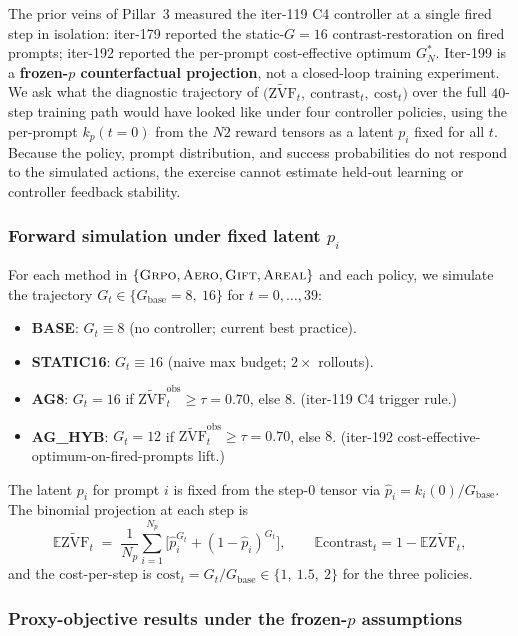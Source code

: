 \documentclass{article}
\newcommand{\grpo}{\textsc{Grpo}}
\newcommand{\E}{\mathbb{E}}
\newcommand{\zvf}{\ensuremath{\widetilde{\mathrm{ZVF}}}}
\begin{document}
The prior veins of Pillar~3 measured the iter-119 C4 controller at a single
fired step in isolation: iter-179 reported the static-$G=16$ contrast-restoration
on fired prompts; iter-192 reported the per-prompt cost-effective optimum
$G_N^*$. Iter-199 is a \textbf{frozen-$p$ counterfactual projection}, not a
closed-loop training experiment. We ask what the diagnostic trajectory of
$\bigl(\zvf_t,\ \mathrm{contrast}_t,\ \mathrm{cost}_t\bigr)$ over the full
$40$-step training path would have looked like under four controller policies,
using the per-prompt $k_p(t=0)$ from the $N2$ reward tensors as a latent
$p_i$ fixed for all $t$. Because the policy, prompt distribution, and success
probabilities do not respond to the simulated actions, the exercise cannot
estimate held-out learning or controller feedback stability.

\subsubsection*{Forward simulation under fixed latent $p_i$}

For each method in $\{\grpo,\textsc{Aero},\textsc{Gift},\textsc{Areal}\}$ and
each policy, we simulate the trajectory $G_t \in \{G_{\text{base}}=8,\ 16\}$
for $t=0,\dots,39$:
\begin{itemize}
\item \textbf{BASE}: $G_t \equiv 8$ (no controller; current best practice).
\item \textbf{STATIC16}: $G_t \equiv 16$ (naive max budget; $2\times$ rollouts).
\item \textbf{AG8}: $G_t = 16$ if $\zvf_t^{\text{obs}} \geq \tau=0.70$, else $8$.
  (iter-119 C4 trigger rule.)
\item \textbf{AG\_HYB}: $G_t = 12$ if $\zvf_t^{\text{obs}} \geq \tau=0.70$, else $8$.
  (iter-192 cost-effective-optimum-on-fired-prompts lift.)
\end{itemize}
The latent $p_i$ for prompt $i$ is fixed from the step-$0$ tensor via
$\hat p_i = k_i(0) / G_{\text{base}}$. The binomial projection at each step is
\[
\E{\zvf}_t \;=\; \frac{1}{N_p}\sum_{i=1}^{N_p}\!\bigl[\hat p_i^{G_t}
+ (1-\hat p_i)^{G_t}\bigr],\qquad
\E{\mathrm{contrast}}_t = 1 - \E{\zvf}_t,
\]
and the cost-per-step is
$\mathrm{cost}_t = G_t / G_{\text{base}} \in \{1,\ 1.5,\ 2\}$ for the three
policies.

\subsubsection*{Proxy-objective results under the frozen-$p$ assumptions}
\end{document}
